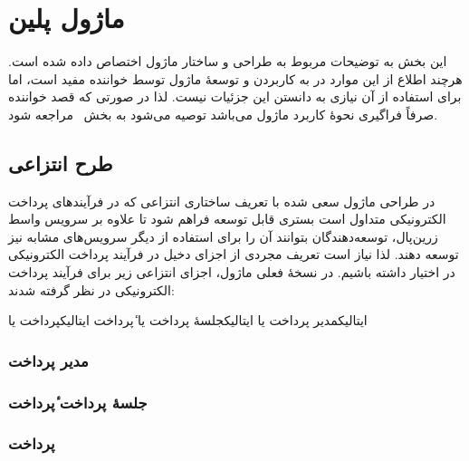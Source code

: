\section{ماژول ‌پلین{}}
\label{بخش:ماژول}

این بخش به توضیحات مربوط به طراحی و ساختار
ماژول  اختصاص داده شده است. هرچند اطلاع
از این موارد در به کاربردن و توسعهٔ ماژول توسط
خواننده مفید است، اما برای استفاده از آن نیازی به
دانستن این جزئیات نیست. لذا در صورتی که قصد
خواننده صرفاً فراگیری نحوهٔ کاربرد ماژول می‌باشد
توصیه می‌شود به بخش~ مراجعه شود.

\subsection{طرح انتزاعی}
در طراحی ماژول سعی شده با تعریف ساختاری انتزاعی
که در فرآیندهای پرداخت الکترونیکی متداول است
بستری قابل توسعه فراهم شود تا علاوه بر سرویس واسط
زرین‌پال، توسعه‌دهندگان بتوانند آن را برای 
استفاده از دیگر سرویس‌های مشابه نیز توسعه دهند.
لذا نیاز است تعریف مجردی از اجزای دخیل در
فرآیند پرداخت الکترونیکی در اختیار داشته باشیم.
در نسخهٔ فعلی ماژول، اجزای انتزاعی زیر برای فرآیند 
پرداخت الکترونیکی در نظر گرفته شدند:
\begin{itemize}
	 ‌ایتالیک{مدیر پرداخت} یا 
	 ‌ایتالیک{جلسهٔ پرداخت} یا ٔ‌پرداخت{}
	 ‌ایتالیک{پرداخت} یا 
\end{itemize}

\subsubsection{مدیر پرداخت }

\subsubsection{جلسهٔ پرداخت ٔ‌پرداخت{}}

\subsubsection{پرداخت }

